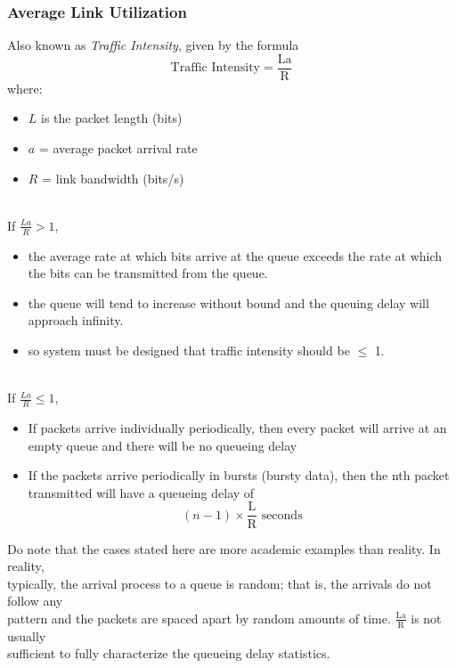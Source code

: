 \documentclass[a4paper]{article}
\begin{document}
\subsubsection{Average Link Utilization}
Also known as \textit{Traffic Intensity}, given by the formula
$$ \text{Traffic Intensity} = \frac{\text{La}}{\text{R}} $$
where:
\begin{itemize}
	\item $L$ is the packet length (bits)
	\item $a$ = average packet arrival rate
	\item $R$ = link bandwidth (bits/s)
\end{itemize}
\mbox{}\\
If $\frac{La}{R} > 1$,
\begin{itemize}
	\item the average rate at which bits arrive at the queue exceeds the rate at which the bits can be transmitted from the queue.
	\item the queue will tend to increase without bound and the queuing delay will approach infinity.
	\item so system must be designed that traffic intensity should be $\leq$ 1.
\end{itemize}
\mbox{}\\
If $\frac{La}{R} \leq 1$,
\begin{itemize}
	\item If packets arrive individually periodically, then every packet will arrive at an empty queue and there will be no queueing delay
	\item If the packets arrive periodically in bursts (bursty data), then the nth packet transmitted will have a queueing delay of $$(n-1)\times\frac{\text{L}}{\text{R}} \text { seconds}$$
\end{itemize}
\begin{framed}
	\begin{displayquote}
		Do note that the cases stated here are more academic examples than reality. In reality,\\ typically, the arrival process to a queue is random; that is, the arrivals do not follow any\\pattern and the packets are spaced apart by random amounts of time. $\frac{\text{La}}{\text{R}}$ is not usually\\ sufficient to fully characterize the queueing delay statistics.
	\end{displayquote}
\end{framed}
\end{document}
